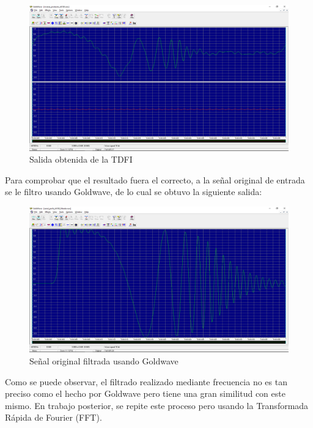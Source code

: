 \begin{figure}[H]
	\centering
	\includegraphics[scale=.32]{img/salida.png}
	\caption{Salida obtenida de la TDFI}
	\label{fig:prueba5}		
\end{figure}
Para comprobar que el resultado fuera el correcto, a la señal original de entrada se le filtro usando Goldwave, de lo cual se obtuvo la siguiente salida:
\begin{figure}[H]
	\centering
	\includegraphics[scale=.32]{img/salida_goldwave.png}
	\caption{Señal original filtrada usando Goldwave}
	\label{fig:prueba6}		
\end{figure}
Como se puede observar, el filtrado realizado mediante frecuencia no es tan preciso como el hecho por Goldwave pero tiene una gran similitud con este mismo. En trabajo posterior, se repite este proceso pero usando la Transformada Rápida de Fourier (FFT).